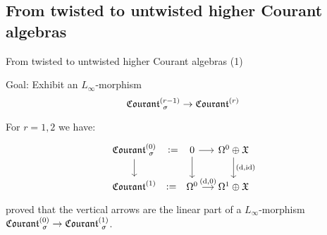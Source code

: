 \documentclass[beamer,10pt]{standalone}
\begin{document}
\subsection{From twisted to untwisted higher Courant algebras}

\begin{frame}{From twisted to untwisted higher Courant algebras (1)}
	\begin{block}{Goal:}
		Exhibit an $L_\infty$-morphism
		$$ \Courant[\sigma]{r-1} \to \Courant{r}$$
	\end{block}
	\vfill \pause	

	\begin{exblock}
	For $r=1,2$ we have:
	\begin{displaymath}
		\begin{tikzcd}[ampersand replacement=\&,column sep = small]
			\Courant[\sigma]{0} \ar[r,phantom,":="] \ar[d]
			\&[1em]
			0 \ar[r] \ar[d]
			\& \Omega^0\oplus \X \ar[d,"{(\d,\id)}"]
			\\
			\Courant{1} \ar[r,phantom,":="] 
			\&
			\Omega^0 \ar[r,"{(\d,0)}"] 
			\& 
			\Omega^1\oplus \X
		\end{tikzcd}
	\end{displaymath}
	\cite{Zambon2012} proved that  the vertical arrows are the linear part of a $L_\infty$-morphism $\Courant[\sigma]{0} \to \Courant[\sigma]{1}$.
	\end{exblock}
	\vfill
	
\end{frame}
\note[itemize]
{
	\item 
}
\end{document}
